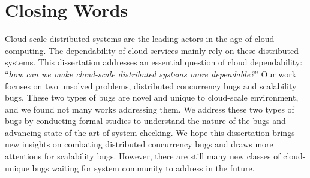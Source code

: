 \section{Closing Words}

Cloud-scale distributed systems are the leading actors in the age of cloud
computing. The dependability of cloud services mainly rely on these distributed
systems. This dissertation addresses an essential question of cloud
dependability: ``{\em how can we make cloud-scale distributed systems more
dependable?}'' Our work focuses on two unsolved problems, distributed
concurrency bugs and scalability bugs. These two types of bugs are novel and
unique to cloud-scale environment, and we found not many works addressing them.
We address these two types of bugs by conducting formal studies to understand
the nature of the bugs and advancing state of the art of system checking. We hope
this dissertation brings new insights on combating distributed concurrency bugs
and draws more attentions for scalability bugs. However, there are still many
new classes of cloud-unique bugs waiting for system community to address in the
future.
